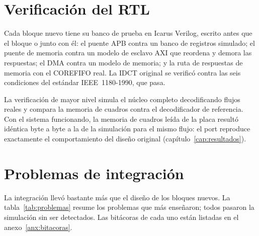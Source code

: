 \section{Verificación del RTL}
\label{sec:verificacion-rtl}

Cada bloque nuevo tiene su banco de prueba en Icarus Verilog, escrito antes
que el bloque o junto con él: el puente APB contra un banco de registros simulado; el puente
de memoria contra un modelo de esclavo AXI que reordena y demora las
respuestas; el DMA contra un modelo de memoria; y la ruta de respuestas de
memoria con el COREFIFO real. La IDCT original se verificó contra las seis
condiciones del estándar IEEE~1180-1990, que pasa.

La verificación de mayor nivel simula el núcleo completo decodificando flujos
reales y compara la memoria de cuadros contra el decodificador de referencia.
Con el sistema funcionando, la memoria de cuadros leída de la placa resultó
idéntica byte a byte a la de la simulación para el mismo flujo: el port
reproduce exactamente el comportamiento del diseño original
(capítulo~\ref{cap:resultados}).

\section{Problemas de integración}
\label{sec:problemas}

La integración llevó bastante más que el diseño de los bloques nuevos. La
tabla~\ref{tab:problemas} resume los problemas que más enseñaron; todos
pasaron la simulación sin ser detectados. Las bitácoras de cada uno están
listadas en el anexo~\ref{anx:bitacoras}.

